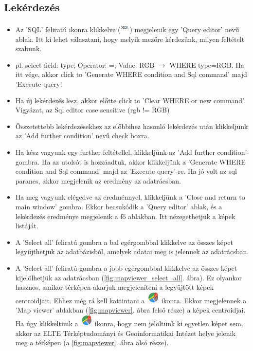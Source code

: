 \documentclass[a4paper,12pt]{article}
\begin{document}
\subsection{Lekérdezés}

\begin{itemize}
	\item  Az 'SQL' feliratú ikonra klikkelve (\includegraphics[width=0.5cm]{sql.png}) megjelenik egy 'Query editor' nevű ablak. Itt ki lehet választani, hogy melyik mezőre kérdezünk, milyen feltételt szabunk.
	
	\item pl. select field: type;  Operator: =; Value: RGB $\rightarrow$ 
	WHERE type=RGB. Ha itt vége, akkor click to 'Generate WHERE condition and Sql command' majd 'Execute query'. 
	
	\item Ha új lekérdezés lesz, akkor előtte click to 'Clear WHERE or new command'. Vigyázat, az Sql editor case sensitive (rgb !=  RGB)
	
	\item Összetettebb lekérdezésekhez az előbbihez hasonló lekérdezés után klikkeljünk az 'Add further condition' nevű check boxra. 
	
	\item Ha kész vagyunk egy further feltétellel, klikkeljünk az 'Add further condition'- gombra. Ha az utolsót is hozzáadtuk, akkor klikkeljünk a 'Generate WHERE condition and Sql command' majd az 'Execute query'-re. Ha jó volt az sql parancs, akkor megjelenik az eredmény az adatrácsban.
	
	\item Ha meg vagyunk elégedve az eredménnyel, klikkeljünk a 'Close and return to main window' gombra. Ekkor becsukódik a 'Query editor' ablak, és a lekérdezés eredménye megjelenik a fő ablakban. Itt nézegethetjük a képek listáját.
	
	\item A 'Select all' feliratú gombra a bal egérgombbal klikkelve az összes képet legyűjthetjük az adatbázisból, amelyek adatai meg is jelennek az adatrácsban.
	
	\item A 'Select all' feliratú gombra a jobb egérgombbal klikkelve az összes képet kijelölhetjük az  adatrácsban (\ref{fig:mapviewer_select_all}. ábra). Ez olyankor hasznos, amikor térképen akarjuk megjeleníteni a legyűjtött képek centroidjait. Ehhez még rá kell kattintani a \includegraphics[width = 0.5 cm]{mapviewer_ikon.png} ikonra. Ekkor megjelennek a 'Map viewer' ablakban (\ref{fig:mapviewer}. ábra felső része) a képek centroidjai. Ha úgy klikkeltünk a \includegraphics[width = 0.5 cm]{mapviewer_ikon.png} ikonra, hogy nem jelöltünk ki egyetlen képet sem, akkor az ELTE Térképtudományi és Geoinformatikai Intézet helye jelenik meg a térképen (a \ref{fig:mapviewer}. ábra alsó része).
	

\end{itemize}
\end{document}
